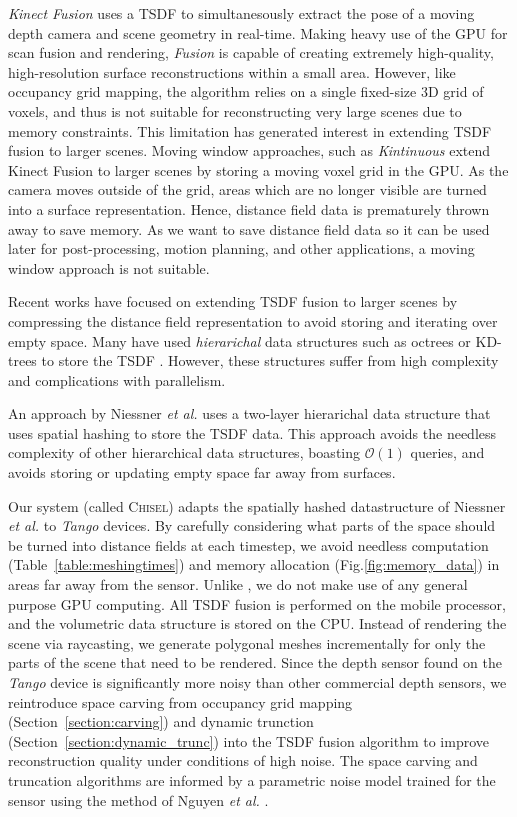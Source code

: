 \documentclass[conference]{IEEEtran}
\newcommand{\sref}[1]{Section~\ref{#1}}
\newcommand{\figref}[1]{Fig.\ref{#1}}
\newcommand{\tabref}[1]{Table~\ref{#1}}
\newcommand{\etal}{\textit{et al. }}
\newcommand{\Tango}{\textit{Tango} }
\newcommand{\chisel}{\textsc{Chisel}\xspace}
\begin{document}
\emph{Kinect Fusion} \cite{Newcombe} uses a TSDF to simultanesously extract the
pose of a moving depth camera and scene geometry in real-time. Making
heavy use of the GPU for scan fusion and rendering, \textit{Fusion} is capable
of creating extremely high-quality, high-resolution surface reconstructions within
a small area. However, like occupancy grid mapping, the algorithm relies on a
single fixed-size 3D grid of voxels, and thus is not suitable for reconstructing
very large scenes due to memory constraints. This limitation has generated
interest in extending  TSDF fusion to larger scenes. 
Moving window approaches, such as \emph{Kintinuous} \cite{Whelan2013} extend
Kinect Fusion to larger scenes by storing  a moving voxel grid in the GPU. As
the camera moves outside of the grid, areas which are no longer visible are
turned into a surface representation. Hence, distance field data is prematurely 
thrown away to save memory. As we want to save distance field data so it can be
used later for post-processing, motion planning, and other applications, a
moving window approach is not suitable.

Recent works have focused on extending TSDF fusion to larger scenes by
compressing the distance field representation to avoid storing and iterating
over empty space. Many have used \textit{hierarichal} data structures such as
octrees or KD-trees to store the TSDF \cite{Zeng2012, Chen2012}. However, these
structures suffer from high complexity and complications with parallelism. 

An approach by Niessner \etal \cite{NiessnerHashing} uses a two-layer
hierarichal data structure that uses spatial hashing \cite{SpatialHashing} to
store the TSDF data. This approach avoids the needless complexity of other
hierarchical data structures, boasting $\mathcal{O}(1)$ queries, and avoids
storing or updating empty space far away from surfaces.

Our system (called \chisel)  adapts the spatially hashed datastructure of
Niessner \etal \cite{NiessnerHashing} to \Tango devices. By carefully
considering what parts of the space should be turned into distance fields at
each timestep, we avoid needless computation (\tabref{table:meshingtimes}) and
memory allocation (\figref{fig:memory_data}) in areas far away from the sensor.
Unlike \cite{NiessnerHashing}, we do not make use of any general purpose GPU
computing. All TSDF fusion is performed on the mobile processor, and the
volumetric data structure is stored on the CPU. Instead of rendering the scene
via raycasting, we generate polygonal meshes incrementally for only the parts
of the scene that need to be rendered. Since the depth sensor found on the
\Tango device is significantly more noisy than other commercial depth
sensors, we reintroduce space carving \cite{Elfes1989} from occupancy grid
mapping (\sref{section:carving}) and dynamic trunction
(\sref{section:dynamic_trunc}) into the TSDF fusion algorithm to improve
reconstruction quality under conditions of high noise. The space carving and
truncation algorithms are informed by a parametric noise model trained for the
sensor using the method of Nguyen \etal \cite{Nguyen2012}.
\end{document}
